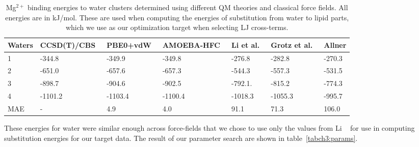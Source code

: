 \begin{table}[H]
    \centering
    \tiny
    \begin{tabularx}{\textwidth}{X|X|X|X|X|X|X}
        \hline
        Waters & CCSD(T)/CBS~\cite{wineman:2020:transferable} & PBE0+vdW~\cite{wineman:2020:transferable} & AMOEBA-HFC~\cite{wineman:2020:transferable} & Li et al.~\cite{merzparams} & Grotz et al.~\cite{microparams}  & Allner \etal{} \cite{villaparams}\\
        \hline
             1  &  -344.8  &  -349.9  &  -349.8  &  -276.8  & -282.8   &-270.3\\
             2  &  -651.0  &  -657.6  &  -657.3  &  -544.3  & -557.3   &-531.5\\
             3  &  -898.7  &  -904.6  &  -902.5  &  -792.1. & -815.2   &-774.3\\
             4  & -1101.2  & -1103.4  & -1100.4  & -1018.3 & -1055.3   &-995.7\\
        MAE &     -        &  4.9       &  4.0        &  91.1     &  71.3& 106.0     \\
        \hline
    \end{tabularx}
        \caption[\mg binding energies to water]{Mg$^{2+}$ binding energies to water clusters determined using different QM
    theories and classical force fields. All energies are in kJ/mol. These are used when
    computing the energies of substitution from water to lipid parts, which we use
    as our optimization target when selecting LJ cross-terms.}
    \label{tabch3:ionwater}
\end{table}
These energies for water were similar enough across force-fields that we chose to use only the values from Li \etal{}~\cite{merzparams} for use in computing substitution energies for our target data.
The result of our parameter search are shown in table~\ref{tabch3:params}.
